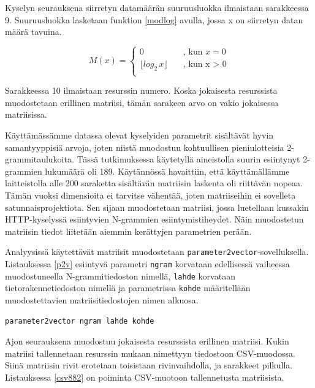 Kyselyn seurauksena siirretyn datamäärän suuruusluokka ilmaistaan
sarakkeessa 9. Suuruusluokka lasketaan funktion \ref{modlog} avulla, jossa x
on siirretyn datan määrä tavuina.

\begin{equation} \label{modlog}
  M(x) = \left\{
  \begin{array}{ll}
    0 & \quad \text{, kun $x = 0$}\\
    \lfloor log_2 \, x \rfloor & \quad \text{, kun x > 0}\\
  \end{array} \right.
\end{equation}

\vskip 0.5cm
Sarakkeessa 10 ilmaistaan resurssin numero. Koska jokaisesta
resurssista muodostetaan erillinen matriisi, tämän sarakeen arvo on
vakio jokaisessa matriisissa.


Käyttämässämme datassa olevat kyselyiden parametrit sisältävät hyvin
samantyyppisiä arvoja, joten niistä muodostuu kohtuullisen
pieniulotteisia 2-\-grammitaulukoita. Tässä tutkimuksessa käytetyllä
aineistolla suurin esiintynyt 2-grammien lukumäärä oli
189. Käytännössä havaittiin, että käyttämällämme laitteistolla alle
200 saraketta sisältävän matriisin laskenta oli riittävän
nopeaa. Tämän vuoksi dimensioita ei tarvitse vähentää, joten matriiseihin ei sovelleta
satunnaisprojektiota. Sen sijaan muodostetaan matriisi, jossa
luetellaan kussakin HTTP-kyselyssä esiintyvien N-grammien
esiintymistiheydet. Näin muodostetun matriisin tiedot liitetään
aiemmin kerättyjen parametrien perään.

Analyysissä käytettävät matriisit muodostetaan
\texttt{parameter2vector}-\-sovelluksella. Listauksessa \ref{p2v}
esiintyvä parametri \texttt{ngram} korvataan edellisessä vaiheessa
muodostuneella N-\-grammitiedoston nimellä, \texttt{lahde} korvataan
tietorakennetiedoston nimellä ja parametrissa \texttt{kohde}
määritellään muodostettavien matriisitiedostojen nimen alkuosa.

\begin{lstlisting}[float=h,language=bashshell,label=p2v,aboveskip=0.5cm,caption=Matriisien
  muodostaminen.]
parameter2vector ngram lahde kohde
\end{lstlisting} 

Ajon seurauksena muodostuu jokaisesta resurssista erillinen
matriisi. Kukin matriisi tallennetaan resurssin mukaan nimettyyn
tiedostoon CSV-muodossa. Siinä matriisin rivit erotetaan toisistaan
rivinvaihdolla, ja sarakkeet pilkulla. Listauksessa \ref{csv882} on
poiminta CSV-muotoon tallennetusta matriisista.

